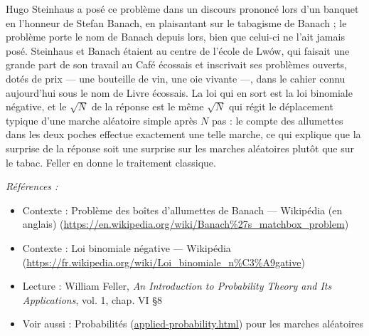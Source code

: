\documentclass[11pt]{article}
\newenvironment{refs}{\par\small\noindent\emph{Références :}\begin{itemize}\setlength\itemsep{0pt}}{\end{itemize}\normalsize}
\begin{document}
\noindent Hugo Steinhaus a posé ce problème dans un discours prononcé lors d'un
banquet en l'honneur de Stefan Banach, en plaisantant sur le tabagisme de Banach ; le
problème porte le nom de Banach depuis lors, bien que celui-ci ne l'ait jamais posé.
Steinhaus et Banach étaient au centre de l'école de Lwów, qui faisait une grande part de son
travail au Café écossais et inscrivait ses problèmes ouverts, dotés de prix --- une bouteille
de vin, une oie vivante ---, dans le cahier connu aujourd'hui sous le nom de Livre écossais.
La loi qui en sort est la loi binomiale négative, et le $ \sqrt{N} $ de la réponse est le
même $ \sqrt{N} $ qui régit le déplacement typique d'une marche aléatoire simple après
$ N $ pas : le compte des allumettes dans les deux poches effectue exactement une telle
marche, ce qui explique que la surprise de la réponse soit une surprise sur les marches
aléatoires plutôt que sur le tabac. Feller en donne le traitement classique.

\begin{refs}
\item Contexte : Problème des boîtes d'allumettes de Banach --- Wikipédia (en anglais) (\url{https://en.wikipedia.org/wiki/Banach%27s_matchbox_problem})
\item Contexte : Loi binomiale négative --- Wikipédia (\url{https://fr.wikipedia.org/wiki/Loi_binomiale_n%C3%A9gative})
\item Lecture : William Feller, \textit{An Introduction to Probability Theory and Its Applications}, vol. 1, chap. VI \S{}8
\item Voir aussi : Probabilités (\url{applied-probability.html}) pour les marches aléatoires
\end{refs}

\bigskip
\end{document}
